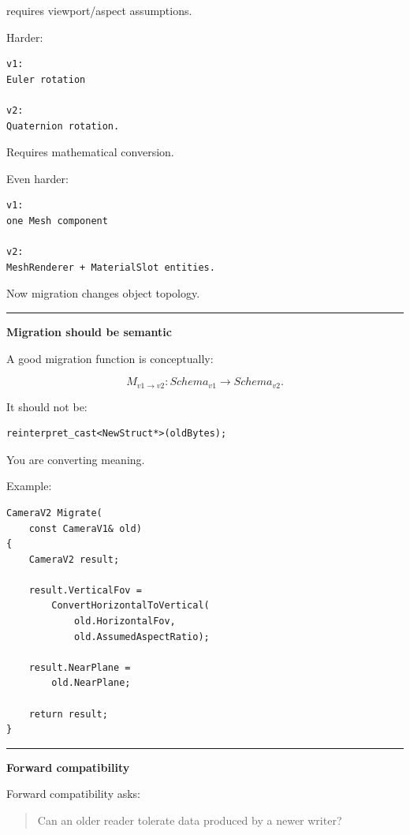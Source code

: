requires viewport/aspect assumptions.

Harder:

\begin{verbatim}
v1:
Euler rotation

v2:
Quaternion rotation.
\end{verbatim}

Requires mathematical conversion.

Even harder:

\begin{verbatim}
v1:
one Mesh component

v2:
MeshRenderer + MaterialSlot entities.
\end{verbatim}

Now migration changes object topology.

\begin{center}\rule{0.5\linewidth}{0.5pt}\end{center}

\textbf{Migration should be semantic}

A good migration function is conceptually:

\[
M_{v1\rightarrow v2}:
Schema_{v1}
\rightarrow
Schema_{v2}.
\]

It should not be:

\begin{verbatim}
reinterpret_cast<NewStruct*>(oldBytes);
\end{verbatim}

You are converting meaning.

Example:

\begin{verbatim}
CameraV2 Migrate(
    const CameraV1& old)
{
    CameraV2 result;

    result.VerticalFov =
        ConvertHorizontalToVertical(
            old.HorizontalFov,
            old.AssumedAspectRatio);

    result.NearPlane =
        old.NearPlane;

    return result;
}
\end{verbatim}

\begin{center}\rule{0.5\linewidth}{0.5pt}\end{center}

\textbf{Forward compatibility}

Forward compatibility asks:

\begin{quote}
Can an older reader tolerate data produced by a newer writer?
\end{quote}

